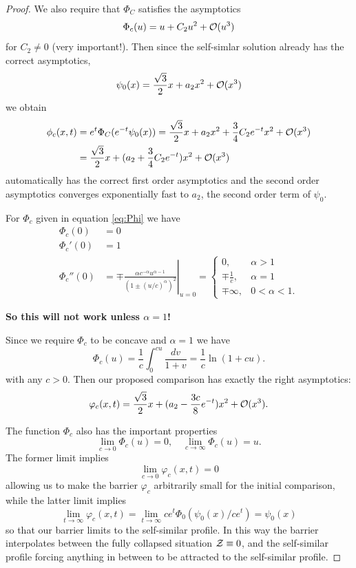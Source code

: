 \documentclass[11pt]{amsart}
\begin{document}
\begin{proof}
We also require that $\Phi_C$ satisfies the asymptotics
\begin{equation}
\label{eq:comparison_asymptotics}
\Phi_c(u) = u + C_2 u^2 + \operatorname{\mathcal{O}}(u^3)
\end{equation}
for $C_2 \ne 0$ (very important!). Then since the self-simlar solution already has the correct asymptotics,
\[
\psi_0(x) = \frac{\sqrt{3}}{2} x + a_2 x^2 + \operatorname{\mathcal{O}}(x^3)
\]
we obtain
\[
\begin{split}
\phi_c(x, t) &= e^t \Phi_C (e^{-t} \psi_0(x)) = \frac{\sqrt{3}}{2} x + a_2 x^2 + \frac{3}{4} C_2 e^{-t} x^2 + \operatorname{\mathcal{O}}(x^3) \\
& =  \frac{\sqrt{3}}{2} x + (a_2  + \frac{3}{4} C_2 e^{-t}) x^2 + \operatorname{\mathcal{O}}(x^3)
\end{split}
\]
automatically has the correct first order asymptotics and the second order asymptotics converges exponentially fast to $a_2$, the second order term of $\psi_0$.

For $\Phi_c$ given in equation \eqref{eq:Phi} we have
\begin{align*}
\Phi_c(0) &= 0 \\
\Phi_c'(0) &= 1 \\
\Phi_c''(0) &= \mp \left.\frac{\alpha c^{-\alpha} u^{\alpha-1}}{(1 \pm (u/c)^{\alpha})^2}\right|_{u=0} = \begin{cases}
0, & \alpha > 1 \\
\mp \tfrac{1}{c}, & \alpha = 1 \\
\mp \infty, &  0 < \alpha < 1.
\end{cases}
\end{align*}

\textbf{So this will not work unless $\alpha=1$!}

Since we require $\Phi_c$ to be concave and $\alpha=1$ we have
\[
\Phi_c(u) =  \frac{1}{c} \int_0^{cu} \frac{dv}{1 + v} = \frac{1}{c} \ln(1 + cu).
\]
with any $c>0$. Then our proposed comparison has exactly the right asymptotics:
\[
\varphi_c(x, t) = \frac{\sqrt{3}}{2} x + (a_2 - \frac{3c}{8} e^{-t}) x^2 + \operatorname{\mathcal{O}}(x^3).
\]

The function $\Phi_c$ also has the important properties
\[
\lim_{c\to 0} \Phi_c (u) = 0, \quad \lim_{c\to \infty} \Phi_c (u) = u.
\]
The former limit implies
\[
\lim_{c\to 0} \varphi_c (x, t) = 0
\]
allowing us to make the barrier $\varphi_c$ arbitrarily small for the initial comparison, while the latter limit implies
\[
\lim_{t\to \infty} \varphi_c(x, t) = \lim_{t\to\infty} c e^t \Phi_0(\psi_0(x)/ce^t) = \psi_0(x)
\]
so that our barrier limits to the self-similar profile. In this way the barrier interpolates between the fully collapsed situation $\operatorname{\mathcal{Z}} \equiv 0$, and the self-similar profile forcing anything in between to be attracted to the self-similar profile.
\end{proof}
\end{document}
